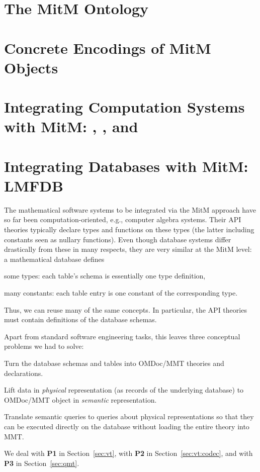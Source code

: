 \documentclass[book]{deliverablereport}
\providecommand{\mmt}{\textsf{MMT}\xspace}
\providecommand{\ommt}{\textsf{OMDoc}/\textsf{MMT}\xspace}
\begin{document}
\section[MitM Ontology]{The MitM Ontology}\label{sec:cgt}



\section{Concrete Encodings of MitM Objects}\label{sec:codecs}


\section[Computation Systems]{Integrating Computation Systems with MitM: \GAP, \Sage, and \Singular}\label{sec:apit}


\section[Databases]{Integrating Databases with MitM: LMFDB}\label{sec:databases}
The mathematical software systems to be integrated via the MitM approach have so far been computation-oriented, e.g., computer algebra systems.
Their API theories typically declare types and functions on these types (the latter including constants seen as nullary functions).
Even though database systems differ drastically from these in many respects, they are very similar at the MitM level: a mathematical database defines
\begin{compactitem}
 \item some types: each table's schema is essentially one type definition,
 \item many constants: each table entry is one constant of the corresponding type.
\end{compactitem}
Thus, we can reuse many of the same concepts.
In particular, the API theories must contain definitions of the database schemas. 

Apart from standard software engineering tasks, this leaves three conceptual problems we had to solve:
\begin{compactenum}[\bf P1]
\item Turn the database schemas and tables into \ommt theories and declarations. 
\item Lift data in \emph{physical} representation (as records of the
  underlying database) to \ommt object in \emph{semantic} representation.
\item Translate semantic queries to queries about physical representations so
  that they can be executed directly on the database without loading the entire theory into
  \mmt.
\end{compactenum}
We deal with \textbf{P1} in Section~\ref{sec:vt}, with \textbf{P2} in Section~\ref{sec:vt:codec}, and with \textbf{P3} in Section~\ref{sec:qmt}. 
\end{document}
